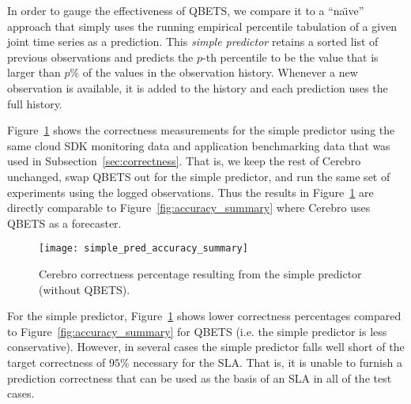 In order to gauge the effectiveness of QBETS, we compare it to a ``na\"{\i}ve''
approach that simply uses the running empirical percentile tabulation
of a given joint time series as a prediction.
This \textit{simple predictor} retains a sorted list of previous observations
and
predicts the $p$-th percentile to be the value that is larger than $p\%$ of
the values in the observation history.  Whenever a new observation is
available, it is added to the history and each prediction uses the full
history.  

Figure~\ref{fig:simple_pred_accuracy} shows the correctness measurements for
the simple predictor using the same cloud SDK monitoring data and application
benchmarking data that was used in Subsection~\ref{sec:correctness}. 
That is, we keep the rest of Cerebro unchanged, swap QBETS out for the simple
predictor, and run the same set of experiments using the logged observations. 
Thus the results in 
Figure~\ref{fig:simple_pred_accuracy} are directly comparable to
Figure~\ref{fig:accuracy_summary} where Cerebro uses QBETS as a forecaster.  

\begin{figure}
\centering
\texttt{[image: simple\_pred\_accuracy\_summary]}
\caption{Cerebro correctness percentage resulting from the simple predictor (without QBETS).}
\label{fig:simple_pred_accuracy}
\end{figure}

For the simple predictor, Figure~\ref{fig:simple_pred_accuracy} shows lower 
correctness percentages compared to Figure~\ref{fig:accuracy_summary} for
QBETS (i.e. the simple predictor is less conservative).
However, in several cases the simple predictor falls well short of the target 
correctness of $95\%$ necessary for the SLA.  That is, it is unable to furnish
a prediction correctness that can be used as the basis of an
SLA in all of the test cases.

